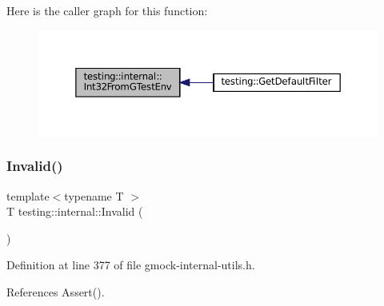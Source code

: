 Here is the caller graph for this function\+:
\nopagebreak
\begin{figure}[H]
\begin{center}
\leavevmode
\includegraphics[width=350pt]{namespacetesting_1_1internal_a0f7e728793f9e6cb0aa2b69eaa468bf3_icgraph}
\end{center}
\end{figure}
\mbox{\label{namespacetesting_1_1internal_a3316c24e8a79f5def3e85d763ae50854}} 
\subsubsection{\texorpdfstring{Invalid()}{Invalid()}}
{\footnotesize\ttfamily template$<$typename T $>$ \\
T testing\+::internal\+::\+Invalid (\begin{DoxyParamCaption}{ }\end{DoxyParamCaption})\hspace{0.3cm}{\ttfamily [inline]}}



Definition at line 377 of file gmock-\/internal-\/utils.\+h.



References Assert().


